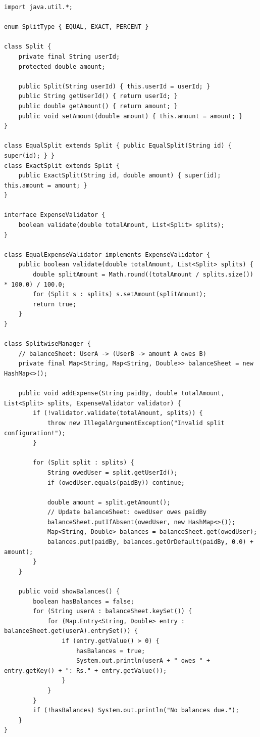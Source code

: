 \documentclass[10pt,journal,compsoc,onecolumn]{IEEEtran}
\begin{document}
\begin{verbatim}
import java.util.*;

enum SplitType { EQUAL, EXACT, PERCENT }

class Split {
    private final String userId;
    protected double amount;

    public Split(String userId) { this.userId = userId; }
    public String getUserId() { return userId; }
    public double getAmount() { return amount; }
    public void setAmount(double amount) { this.amount = amount; }
}

class EqualSplit extends Split { public EqualSplit(String id) { super(id); } }
class ExactSplit extends Split {
    public ExactSplit(String id, double amount) { super(id); this.amount = amount; }
}

interface ExpenseValidator {
    boolean validate(double totalAmount, List<Split> splits);
}

class EqualExpenseValidator implements ExpenseValidator {
    public boolean validate(double totalAmount, List<Split> splits) {
        double splitAmount = Math.round((totalAmount / splits.size()) * 100.0) / 100.0;
        for (Split s : splits) s.setAmount(splitAmount);
        return true;
    }
}

class SplitwiseManager {
    // balanceSheet: UserA -> (UserB -> amount A owes B)
    private final Map<String, Map<String, Double>> balanceSheet = new HashMap<>();

    public void addExpense(String paidBy, double totalAmount, List<Split> splits, ExpenseValidator validator) {
        if (!validator.validate(totalAmount, splits)) {
            throw new IllegalArgumentException("Invalid split configuration!");
        }

        for (Split split : splits) {
            String owedUser = split.getUserId();
            if (owedUser.equals(paidBy)) continue;

            double amount = split.getAmount();
            // Update balanceSheet: owedUser owes paidBy
            balanceSheet.putIfAbsent(owedUser, new HashMap<>());
            Map<String, Double> balances = balanceSheet.get(owedUser);
            balances.put(paidBy, balances.getOrDefault(paidBy, 0.0) + amount);
        }
    }

    public void showBalances() {
        boolean hasBalances = false;
        for (String userA : balanceSheet.keySet()) {
            for (Map.Entry<String, Double> entry : balanceSheet.get(userA).entrySet()) {
                if (entry.getValue() > 0) {
                    hasBalances = true;
                    System.out.println(userA + " owes " + entry.getKey() + ": Rs." + entry.getValue());
                }
            }
        }
        if (!hasBalances) System.out.println("No balances due.");
    }
}
\end{verbatim}
\end{document}
